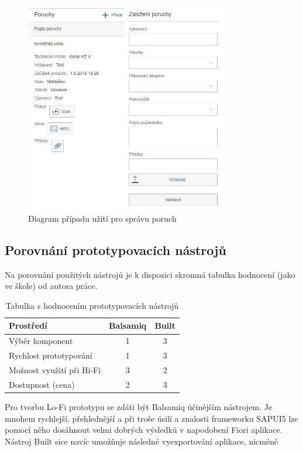 \documentclass[thesis=M,czech]{FITthesis}[2012/06/26]
\begin{document}
\begin{figure}[H]
	\centering
	\includegraphics[width=0.8\textwidth]{images/bu_mob}
	\caption{Diagram případu užití pro správu poruch}
	\label{img:bu_mob}
\end{figure}

\subsection{Porovnání prototypovacích nástrojů}
Na porovnání použitých nástrojů je k dispozici skromná tabulka hodnocení (jako ve škole) od autora práce.
\begin{center}
	\begin{table}[H]
		\centering
		\begin{tabular}{| l | c | c |}
			\hline 
			Prostředí 						& Balsamiq 	&	Built \\ 
			\hline	
			\hline
			Výběr komponent					&	1		&	3			\\ 
			\hline
			Rychlost prototypování			&	1		&	3			\\
			\hline
			Možnost využití při Hi-Fi		&	3		&	2			\\
			\hline
			Dostupnost (cena)				&	2		&	3			\\
			\hline		
		\end{tabular}
		\caption {Tabulka s hodnocením prototypovacích nástrojů} 
		\label{tab:prototyp_comp}
	\end{table}
\end{center}
Pro tvorbu Lo-Fi prototypu se zdáti být Balsamiq účinějším nástrojem. Je mnohem rychlejší, přehlednější a při troše úsilí a znalosti frameworku SAPUI5 lze pomocí něho dosáhnout velmi dobrých výsledků v napodobení Fiori aplikace. Nástroj Built sice navíc umožňuje následné vyexportování aplikace, nicméně 
\end{document}
